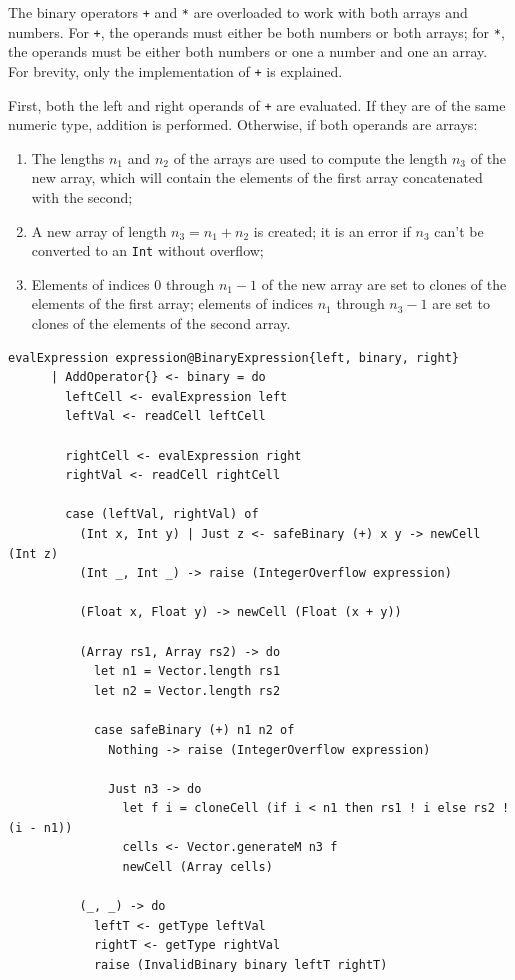 \documentclass[UdineBachThesis,american,11pt]{PhdThesis}
\begin{document}
  The binary operators \texttt{+} and \texttt{*} are overloaded to work with
  both arrays and numbers. For \texttt{+}, the operands must either be both
  numbers or both arrays; for \texttt{*}, the operands must be either both
  numbers or one a number and one an array. For brevity, only the implementation
  of \texttt{+} is explained.

  First, both the left and right operands of \texttt{+} are evaluated. If they
  are of the same numeric type, addition is performed. Otherwise, if both
  operands are arrays:

  \begin{enumerate}
    \item The lengths \mbox{$n_1$} and \mbox{$n_2$} of the arrays are used to
    compute the length \mbox{$n_3$} of the new array, which will contain the
    elements of the first array concatenated with the second;

    \item A new array of length \mbox{$n_3 = n_1 + n_2$} is created; it is an
    error if \mbox{$n_3$} can't be converted to an \mbox{\texttt{Int}} without
    overflow;

    \item Elements of indices $0$ through \mbox{$n_1 - 1$} of the new array are
    set to clones of the elements of the first array; elements of indices
    \mbox{$n_1$} through \mbox{$n_3 - 1$} are set to clones of the elements of
    the second array.
  \end{enumerate}

  \begin{Verbatim}[gobble=4,fontsize=\small]
    evalExpression expression@BinaryExpression{left, binary, right}
      | AddOperator{} <- binary = do
        leftCell <- evalExpression left
        leftVal <- readCell leftCell

        rightCell <- evalExpression right
        rightVal <- readCell rightCell

        case (leftVal, rightVal) of
          (Int x, Int y) | Just z <- safeBinary (+) x y -> newCell (Int z)
          (Int _, Int _) -> raise (IntegerOverflow expression)

          (Float x, Float y) -> newCell (Float (x + y))

          (Array rs1, Array rs2) -> do
            let n1 = Vector.length rs1
            let n2 = Vector.length rs2

            case safeBinary (+) n1 n2 of
              Nothing -> raise (IntegerOverflow expression)

              Just n3 -> do
                let f i = cloneCell (if i < n1 then rs1 ! i else rs2 ! (i - n1))
                cells <- Vector.generateM n3 f
                newCell (Array cells)

          (_, _) -> do
            leftT <- getType leftVal
            rightT <- getType rightVal
            raise (InvalidBinary binary leftT rightT)
  \end{Verbatim}
\end{document}
